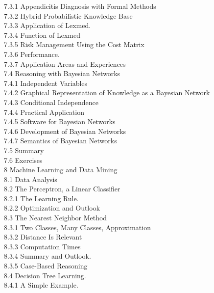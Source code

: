 \documentclass[10pt]{book}
\begin{document}
7.3.1 Appendicitis Diagnosis with Formal Methods \\
7.3.2 Hybrid Probabilistic Knowledge Base \\
7.3.3 Application of Lexmed. \\
7.3.4 Function of Lexmed \\
7.3.5 Risk Management Using the Cost Matrix \\
7.3.6 Performance. \\
7.3.7 Application Areas and Experiences \\
7.4 Reasoning with Bayesian Networks \\
7.4.1 Independent Variables \\
7.4.2 Graphical Representation of Knowledge as a Bayesian Network \\
7.4.3 Conditional Independence \\
7.4.4 Practical Application \\
7.4.5 Software for Bayesian Networks \\
7.4.6 Development of Bayesian Networks \\
7.4.7 Semantics of Bayesian Networks \\
7.5 Summary \\
7.6 Exercises \\
8 Machine Learning and Data Mining \\
8.1 Data Analysis \\
8.2 The Perceptron, a Linear Classifier \\
8.2.1 The Learning Rule. \\
8.2.2 Optimization and Outlook \\
8.3 The Nearest Neighbor Method \\
8.3.1 Two Classes, Many Classes, Approximation \\
8.3.2 Distance Is Relevant \\
8.3.3 Computation Times \\
8.3.4 Summary and Outlook. \\
8.3.5 Case-Based Reasoning \\
8.4 Decision Tree Learning. \\
8.4.1 A Simple Example. \\
\end{document}
